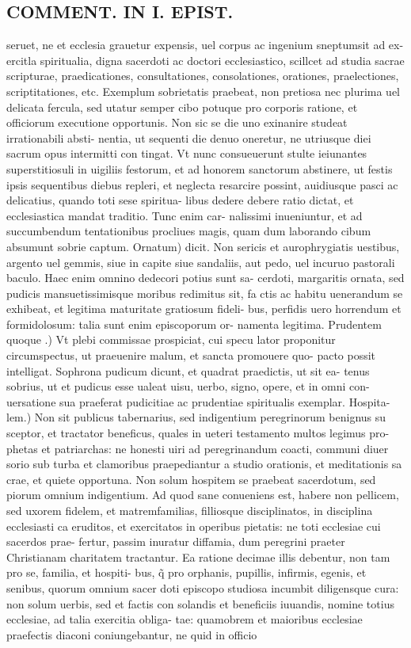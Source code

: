 \documentclass{article}
\begin{document}
\begin{pages}
\section*{COMMENT. IN I. EPIST. }
\marginpar{[ p.496 ]}\pstart seruet, ne et ecclesia grauetur expensis, uel corpus ac ingenium sneptumsit ad ex- ercitla spiritualia, digna sacerdoti ac doctori ecclesiastico, scillcet ad studia sacrae scripturae, praedicationes, consultationes, consolationes, orationes, praelectiones, scriptitationes, etc. Exemplum sobrietatis praebeat, non pretiosa nec plurima uel delicata fercula, sed utatur semper cibo potuque pro corporis ratione, et officiorum executione opportunis. Non sic se die uno exinanire studeat irrationabili absti- nentia, ut sequenti die denuo oneretur, ne utriusque diei sacrum opus intermitti con tingat. Vt nunc consueuerunt stulte ieiunantes superstitiosuli in uigiliis festorum, et ad honorem sanctorum abstinere, ut festis ipsis sequentibus diebus repleri, et neglecta resarcire possint, auidiusque pasci ac delicatius, quando toti sese spiritua- libus dedere debere ratio dictat, et ecclesiastica mandat traditio. Tunc enim car- nalissimi inueniuntur, et ad succumbendum tentationibus procliues magis, quam dum laborando cibum absumunt sobrie captum. Ornatum) dicit. Non sericis et aurophrygiatis uestibus, argento uel gemmis, siue in capite siue sandaliis, aut pedo, uel incuruo pastorali baculo. Haec enim omnino dedecori potius sunt sa- cerdoti, margaritis ornata, sed pudicis mansuetissimisque moribus redimitus sit, fa ctis ac habitu uenerandum se exhibeat, et legitima maturitate gratiosum fideli- bus, perfidis uero horrendum et formidolosum: talia sunt enim episcoporum or- namenta legitima. Prudentem quoque .) Vt plebi commissae prospiciat, cui specu lator proponitur circumspectus, ut praeuenire malum, et sancta promouere quo- pacto possit intelligat. Sophrona pudicum dicunt, et quadrat praedictis, ut sit ea- tenus sobrius, ut et pudicus esse ualeat uisu, uerbo, signo, opere, et in omni con- uersatione sua praeferat pudicitiae ac prudentiae spiritualis exemplar. Hospita- lem.) Non sit publicus tabernarius, sed indigentium peregrinorum benignus su sceptor, et tractator beneficus, quales in ueteri testamento multos legimus pro- phetas et patriarchas: ne honesti uiri ad peregrinandum coacti, communi diuer sorio sub turba et clamoribus praepediantur a studio orationis, et meditationis sa crae, et quiete opportuna. Non solum hospitem se praebeat sacerdotum, sed piorum omnium indigentium. Ad quod sane conueniens est, habere non pellicem, sed uxorem fidelem, et matremfamilias, filliosque disciplinatos, in disciplina ecclesiasti ca eruditos, et exercitatos in operibus pietatis: ne toti ecclesiae cui sacerdos prae- fertur, passim inuratur diffamia, dum peregrini praeter Christianam charitatem tractantur. Ea ratione decimae illis debentur, non tam pro se, familia, et hospiti- bus, q̃ pro orphanis, pupillis, infirmis, egenis, et senibus, quorum omnium sacer doti episcopo studiosa incumbit diligensque cura: non solum uerbis, sed et factis con solandis et beneficiis iuuandis, nomine totius ecclesiae, ad talia exercitia obliga- tae: quamobrem et maioribus ecclesiae praefectis diaconi coniungebantur, ne quid in officio 
\end{pages}
\end{document}
